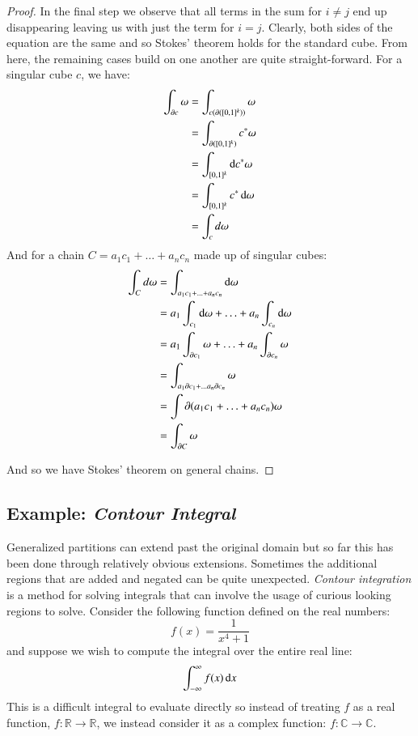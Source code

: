 \begin{proof}
In the final step we observe that all terms in the sum for $i \neq j$ end up disappearing leaving us with just the term for
$i=j$.
Clearly, both sides of the equation are the same and so Stokes' theorem holds for the standard cube.
From here, the remaining cases build on one another are quite straight-forward.
For a singular cube $c$, we have:
\begin{align*}
	\int_{\partial c} \omega
		&= \int_{c (\partial ([0,1]^k))} \omega \\
		&= \int_{\partial( [0,1]^k)} c^* \omega \\
		&= \int_{[0,1]^k} \mathop{}\!\mathrm{d} c^* \omega \\
		&= \int_{[0,1]^k} c^* \mathop{}\!\mathrm{d} \omega \\
		&= \int_c d\omega
\end{align*}
And for a chain $C=a_1 c_1 + \ldots + a_n c_n$ made up of singular cubes:
\begin{align*}
	\int_C d\omega 
		&= \int_{a_1c_1 + \ldots + a_nc_n	} \mathop{}\!\mathrm{d}\omega \\
		&= a_1 \int_{c_1} \mathop{}\!\mathrm{d}\omega + \ldots + a_n \int_{c_n} \mathop{}\!\mathrm{d}\omega \\
		&= a_1 \int_{\partial c_1} \omega + \ldots + a_n \int_{\partial c_n} \omega \\
		&= \int_{a_1 \partial c_1 + \ldots a_n \partial c_n} \omega \\
		&= \int{\partial ( a_1c_1 + \ldots + a_n c_n)} \omega \\
		&= \int_{\partial C} \omega
\end{align*}

And so we have Stokes' theorem on general chains.
\end{proof}


\subsection{Example: \emph{Contour Integral}}


Generalized partitions can extend past the original domain but so far this has been done through relatively
obvious extensions.
Sometimes the additional regions that are added and negated can be quite unexpected.
\emph{Contour integration} is a method for solving integrals that can involve the usage of curious looking regions to solve.
Consider the following function defined on the real numbers:
\begin{equation}
	f(x) = \frac{1}{x^4 + 1}
\end{equation}
and suppose we wish to compute the integral over the entire real line:
\begin{equation}
	 \int_{-\infty}^\infty f(x) \mathop{}\!\mathrm{d} x
\end{equation}
This is a difficult integral to evaluate directly so instead of treating $f$ as a real function, $f:\mathbb{R} \to \mathbb{R}$, 
we instead consider it as a complex function: $f:\mathbb{C} \to \mathbb{C}$.


